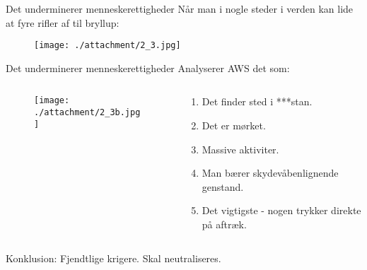     \begin{frame}{Det underminerer menneskerettigheder}
      Når man i nogle steder i verden kan lide at fyre rifler af til bryllup:
        \begin{figure}
          \centering
          \texttt{[image: ./attachment/2\_3.jpg]}
        \end{figure}
    \end{frame}

    \begin{frame}{Det underminerer menneskerettigheder}
      Analyserer AWS det som:
      \begin{columns}[c,onlytextwidth]
        \begin{column}{0.5\textwidth}
        \begin{figure}
          \centering
          \texttt{[image: ./attachment/2\_3b.jpg]}
        \end{figure}
        \end{column}
        \begin{column}{0.5\textwidth}
          \begin{enumerate}
          \item Det finder sted i ***stan.
          \item Det er mørket.
            \item Massive aktiviter.
          \item Man bærer skydevåbenlignende genstand.
          \item Det vigtigste - nogen trykker direkte på aftræk.
            \end{enumerate}
        \end{column}
      \end{columns}
      Konklusion: Fjendtlige krigere. Skal neutraliseres.
    \end{frame}

